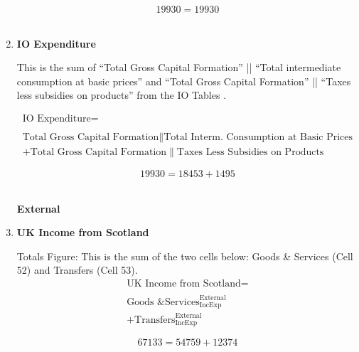 \begin{enumerate}
\begin{equation} \nonumber
19930 = 19930
\end{equation}\\


\item \textbf {IO Expenditure}

This is the sum of ``Total Gross Capital Formation'' || ``Total intermediate consumption at basic prices'' and ``Total Gross Capital Formation'' || ``Taxes less subsidies on products'' from the IO Tables \cite{ScotGov2013a}.

\begin{equation}
\begin{split}
\text{IO Expenditure} =  \\ \\
\text{Total Gross Capital Formation}\|\text{Total Interm. Consumption at Basic Prices}\\
+\text{Total Gross Capital Formation}\|\text{Taxes Less Subsidies on Products}
\end{split} \label{eq:2.5.54}
\end{equation}

\begin{equation} \nonumber
19930 = 18453+1495
\end{equation}\\



\pagebreak


\begin{center}
\textbf{\LARGE External}
\end{center}

\item \textbf {UK Income from Scotland}

Totals Figure: This is the sum of the two cells below: Goods \& Services (Cell 52) and Transfers (Cell 53).\\

\begin{equation}
\begin{split}
\text{UK Income from Scotland} =  \\ \\
\text{Goods \& Services}^\text{External}_\text{IncExp}\\
+\text{Transfers}^\text{External}_\text{IncExp}
\end{split} \label{eq:2.5.55}
\end{equation}

\begin{equation} \nonumber
67133 = 54759+12374
\end{equation}\\



\end{enumerate}
